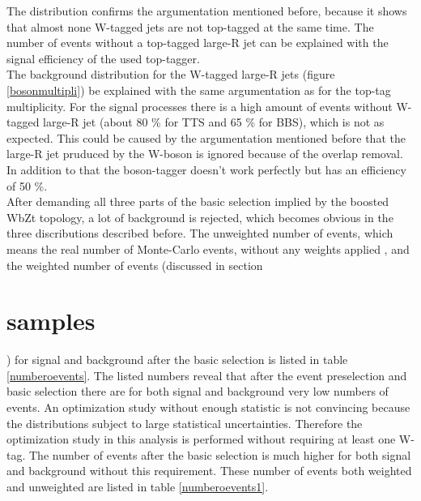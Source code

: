 The distribution confirms the argumentation mentioned before, because it shows that almost none W-tagged jets are not top-tagged at the same time.
The number of events without a top-tagged large-R jet can be explained with the signal efficiency of the used top-tagger.\\
The background distribution for the W-tagged large-R jets (figure \ref{bosonmultipli}) be explained with the same argumentation as for the top-tag multiplicity.
For the signal processes there is a high amount of events without W-tagged large-R jet (about 80 \% for TTS and 65 \% for BBS), which is not as expected.
This could be caused by the argumentation mentioned before that the large-R jet pruduced by the W-boson is ignored because of the overlap removal.
In addition to that the boson-tagger doesn't work perfectly but has an efficiency of 50 \%.\\
After demanding all three parts of the basic selection implied by the boosted WbZt topology, a lot of background is rejected, which becomes obvious in the three discributions described before.
The unweighted number of events, which means the real number of Monte-Carlo events, without any weights applied , and the weighted number of events (discussed in section \section{samples}) for signal and background after the basic selection is listed in table \ref{numberoevents}.
The listed numbers reveal that after the event preselection and basic selection there are for both signal and background very  low numbers of events.
An optimization study without enough statistic is not convincing because the distributions subject to large statistical uncertainties.
Therefore the optimization study in this analysis is performed without requiring at least one W-tag.
The number of events after the basic selection is much higher for both signal and background without this requirement.
These number of events both weighted and unweighted are listed in table \ref{numberoevents1}.

\begin{table}
\centering
\caption{Unweighted and weighted number of events for signal and background processes after requiring two large-R jets and both top- and W-tag.}
\label{numberoevents}
\end{table}




